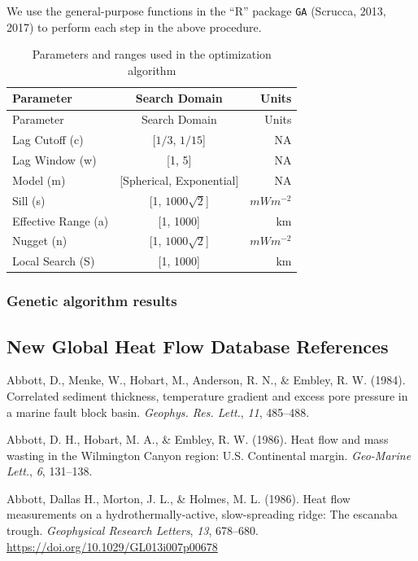 \documentclass[draft,linenumbers]{agujournal2018}
\begin{document}
We use the general-purpose functions in the ``R'' package \texttt{GA}
(Scrucca, 2013, 2017) to perform each step in the above procedure.

\hypertarget{tbl:search}{}
\begin{longtable}[]{@{}lcr@{}}
\caption{\label{tbl:search}Parameters and ranges used in the
optimization algorithm}\tabularnewline
\toprule
Parameter & Search Domain & Units \\
\midrule
\endfirsthead
\toprule
Parameter & Search Domain & Units \\
\midrule
\endhead
Lag Cutoff (c) & {[}\(1/3\), \(1/15\){]} & NA \\
Lag Window (w) & {[}1, 5{]} & NA \\
Model (m) & {[}Spherical, Exponential{]} & NA \\
Sill (s) & {[}1, \(1000\sqrt{2}\){]} & \(mWm^{-2}\) \\
Effective Range (a) & {[}1, 1000{]} & km \\
Nugget (n) & {[}1, \(1000\sqrt{2}\){]} & \(mWm^{-2}\) \\
Local Search (S) & {[}1, 1000{]} & km \\
\bottomrule
\end{longtable}

\subsubsection{Genetic algorithm results}

\subsection{New Global Heat Flow Database References}

\hypertarget{refs_nghf}{}
\leavevmode{}%
Abbott, D., Menke, W., Hobart, M., Anderson, R. N., \& Embley, R. W.
(1984). Correlated sediment thickness, temperature gradient and excess
pore pressure in a marine fault block basin. \emph{Geophys. Res. Lett.},
\emph{11}, 485--488.

\leavevmode{}%
Abbott, D. H., Hobart, M. A., \& Embley, R. W. (1986). Heat flow and
mass wasting in the {Wilmington Canyon} region: {U.S.} Continental
margin. \emph{Geo-Marine Lett.}, \emph{6}, 131--138.

\leavevmode{}%
Abbott, Dallas H., Morton, J. L., \& Holmes, M. L. (1986). Heat flow
measurements on a hydrothermally-active, slow-spreading ridge: The
escanaba trough. \emph{Geophysical Research Letters}, \emph{13},
678--680. \url{https://doi.org/10.1029/GL013i007p00678}
\end{document}
